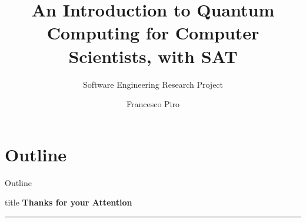 

\title{\Large \textbf{An Introduction to Quantum Computing for Computer Scientists, with SAT}}
\subtitle{Software Engineering  Research Project}



\author{Francesco Piro}


	
{
	\frame{\titlepage}
}

\section*{Outline}
	\begin{frame}{Outline}
		\vspace{-1cm}
		\textbf{\tableofcontents}
	\end{frame}

\clearpage


\clearpage


\begin{frame}[plain]
	\vfill
	\centering
	\begin{beamercolorbox}[sep=8pt,center,shadow=true,rounded=true]{title}
		\textbf{Thanks for your Attention}\par%
		\color{polimiblue}\noindent\rule{10cm}{1pt} \\
	\end{beamercolorbox}
	\vfill
\end{frame}




